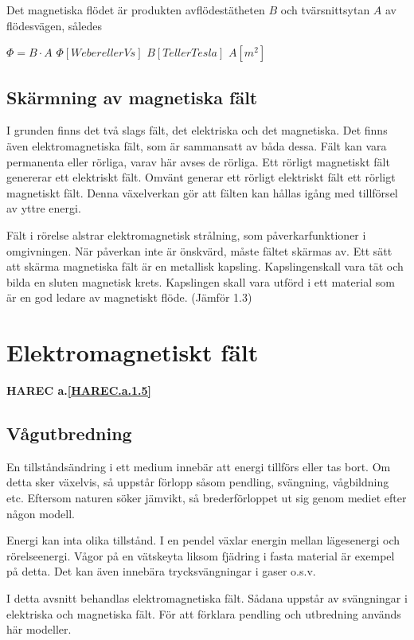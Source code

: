 Det magnetiska flödet är produkten avflödestätheten $B$ och tvärsnittsytan $A$ av flödesvägen, således

$\Phi = B \cdot A$
$\Phi [Weber eller Vs]$ $B [T eller Tesla]$ $A [m^2]$

\subsection{Skärmning av magnetiska fält}

I grunden finns det två slags fält, det elektriska och det magnetiska. Det finns även
elektromagnetiska fält, som är sammansatt av båda dessa. Fält kan vara permanenta eller
rörliga, varav här avses de rörliga. Ett rörligt magnetiskt fält genererar ett elektriskt
fält.
Omvänt generar ett rörligt elektriskt fält ett rörligt magnetiskt fält. Denna växelverkan
gör att fälten kan hållas igång med tillförsel av yttre energi.

Fält i rörelse alstrar elektromagnetisk strålning, som påverkarfunktioner i omgivningen.
När påverkan inte är önskvärd, måste fältet skärmas av. Ett sätt att skärma magnetiska
fält är en metallisk kapsling. Kapslingenskall vara tät och bilda en sluten magnetisk
krets. Kapslingen skall vara utförd i ett material som är en god ledare av magnetiskt
flöde.
(Jämför 1.3)

\cleardoublepage

\section{Elektromagnetiskt fält}
\textbf{HAREC a.\ref{HAREC.a.1.5}\label{myHAREC.a.1.5}}

\subsection{Vågutbredning}

En tillståndsändring i ett medium innebär att energi tillförs eller tas bort. Om detta
sker växelvis, så uppstår förlopp såsom pendling, svängning, vågbildning etc.
Eftersom naturen söker jämvikt, så brederförloppet ut sig genom mediet efter någon modell.

Energi kan inta olika tillstånd. I en pendel växlar energin mellan lägesenergi och
rörelseenergi. Vågor på en vätskeyta liksom fjädring i fasta material är exempel på
detta. Det kan även innebära trycksvängningar i gaser o.s.v.

I detta avsnitt behandlas elektromagnetiska fält. Sådana uppstår av svängningar i
elektriska och magnetiska fält. För att förklara pendling och utbredning används här
modeller.


